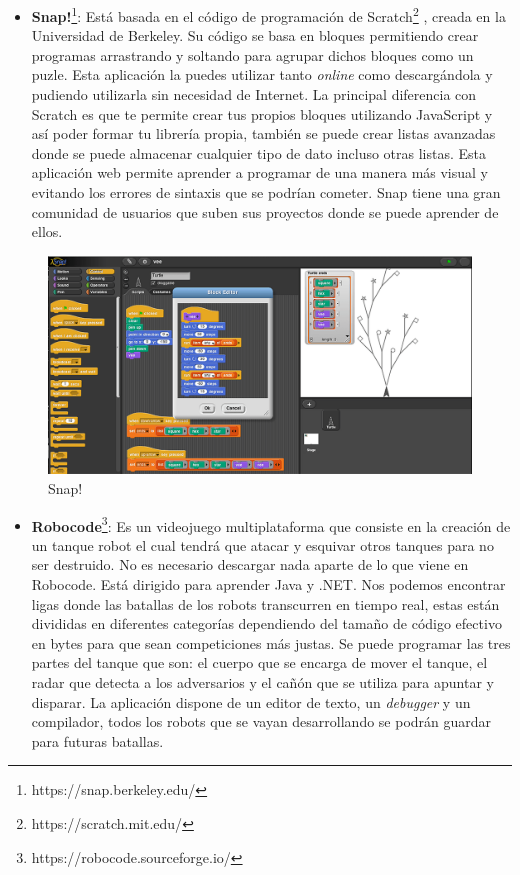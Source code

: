 \begin{itemize}
\item \textbf{Snap!}\footnote{https://snap.berkeley.edu/}: Está basada en el código de programación de Scratch\footnote{ https://scratch.mit.edu/} , creada en la Universidad de Berkeley. Su código se basa en bloques permitiendo crear programas arrastrando y soltando para agrupar dichos bloques como un puzle. Esta aplicación la puedes utilizar tanto \textit{online} como descargándola y pudiendo utilizarla sin necesidad de Internet. La principal diferencia con Scratch es que te permite crear tus propios bloques utilizando JavaScript y así poder formar tu librería propia, también se puede crear listas avanzadas donde se puede almacenar cualquier tipo de dato incluso otras listas.  Esta aplicación web permite aprender a programar de una manera más visual y evitando los errores de sintaxis que se podrían cometer. Snap tiene una gran comunidad de usuarios que suben sus proyectos donde se puede aprender de ellos.\cite{app}
\end{itemize}

\begin{figure}[H]
    \centering
    \includegraphics[width=15cm, keepaspectratio]{img/snap.png}
    \caption{Snap!}
    \label{fig:snap}
\end{figure}

\begin{itemize}
\item \textbf{Robocode}\footnote{https://robocode.sourceforge.io/}: Es un videojuego multiplataforma que consiste en la creación de un tanque robot el cual tendrá que atacar y esquivar otros tanques para no ser destruido. No es necesario descargar nada aparte de lo que viene en Robocode. Está dirigido para aprender Java y .NET. Nos podemos encontrar ligas donde las batallas de los robots transcurren en tiempo real, estas están divididas en diferentes categorías dependiendo del tamaño de código efectivo en bytes para que sean competiciones más justas. Se puede programar las tres partes del tanque que son: el cuerpo que se encarga de mover el tanque, el radar que detecta a los adversarios y el cañón que se utiliza para apuntar y disparar. La aplicación dispone de un editor de texto, un \textit{debugger} y un compilador, todos los robots que se vayan desarrollando se podrán guardar para futuras batallas.\cite{app}
\end{itemize}

